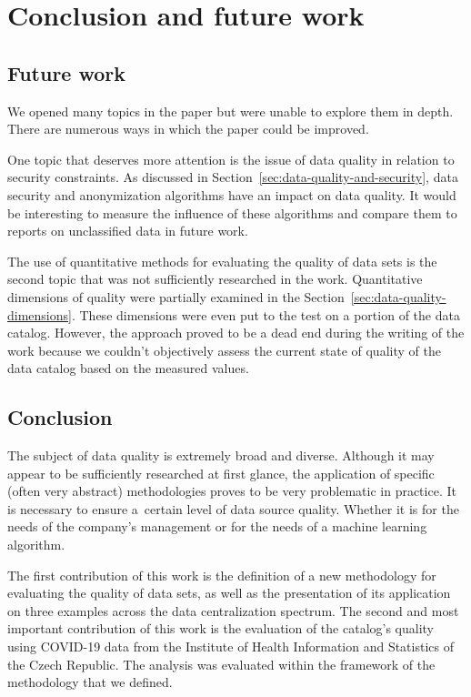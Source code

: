 \chapter{Conclusion and future work}\label{ch:conclusion-and-future-work}

\section{Future work}\label{sec:future-work}

We opened many topics in the paper but were unable to explore them in depth.
There are numerous ways in which the paper could be improved.

One topic that deserves more attention is the issue of data quality in relation to security constraints.
As discussed in Section~\ref{sec:data-quality-and-security}, data security and anonymization algorithms have an impact on data quality.
It would be interesting to measure the influence of these algorithms and compare them to reports on unclassified data in future work.

The use of quantitative methods for evaluating the quality of data sets is the second topic that was not sufficiently researched in the work.
Quantitative dimensions of quality were partially examined in the Section~\ref{sec:data-quality-dimensions}.
These dimensions were even put to the test on a portion of the data catalog.
However, the approach proved to be a dead end during the writing of the work because we couldn't objectively assess the current state of quality of the data catalog based on the measured values.

\section{Conclusion}\label{sec:conclusion}

The subject of data quality is extremely broad and diverse.
Although it may appear to be sufficiently researched at first glance, the application of specific (often very abstract) methodologies proves to be very problematic in practice.
It is necessary to ensure a~certain level of data source quality.
Whether it is for the needs of the company's management or for the needs of a machine learning algorithm.

The first contribution of this work is the definition of a new methodology for evaluating the quality of data sets, as well as the presentation of its application on three examples across the data centralization spectrum.
The second and most important contribution of this work is the evaluation of the catalog's quality using COVID-19 data from the Institute of Health Information and Statistics of the Czech Republic.
The analysis was evaluated within the framework of the methodology that we defined.

